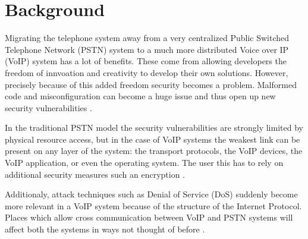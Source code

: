 \section{Background}


Migrating the telephone system away from a very centralized Public Switched Telephone Network (PSTN) system to a much more distributed Voice over IP (VoIP) system has a lot of benefits. These come from allowing developers the freedom of innvoation and creativity to develop their own solutions. However, precisely because of this added freedom security becomes a problem. Malformed code and misconfiguration can become a huge issue and thus open up new security vulnerabilities \cite{voipbg}. 

In the traditional PSTN model the security vulnerabilities are strongly limited by physical resource access, but in the case of VoIP systems the weakest link can be present on any layer of the system: the transport protocols, the VoIP devices, the VoIP application, or even the operating system. The user this has to rely on additional security measures such an encryption \cite{voipbg}. 

Additionaly, attack techniques such as Denial of Service (DoS) suddenly become more relevant in a VoIP system because of the structure of the Internet Protocol. Places which allow cross communication between VoIP and PSTN systems will affect both the systems in ways not thought of before \cite{voipbg}.

